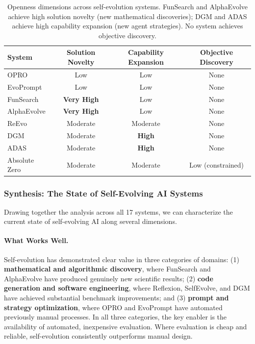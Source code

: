 \begin{table}[htbp]
\centering
\begin{tabular}{lccc}
\toprule
\textbf{System} & \textbf{Solution Novelty} & \textbf{Capability Expansion} & \textbf{Objective Discovery} \\
\midrule
OPRO & Low & Low & None \\
EvoPrompt & Low & Low & None \\
FunSearch & \textbf{Very High} & Low & None \\
AlphaEvolve & \textbf{Very High} & Low & None \\
ReEvo & Moderate & Moderate & None \\
DGM & Moderate & \textbf{High} & None \\
ADAS & Moderate & \textbf{High} & None \\
Absolute Zero & Moderate & Moderate & Low (constrained) \\
\bottomrule
\end{tabular}
\caption{Openness dimensions across self-evolution systems. FunSearch and AlphaEvolve achieve high solution novelty (new mathematical discoveries); DGM and ADAS achieve high capability expansion (new agent strategies). No system achieves objective discovery.}
\label{tab:openness}
\end{table}


\subsubsection{Synthesis: The State of Self-Evolving AI Systems}

Drawing together the analysis across all 17 systems, we can characterize the current state of self-evolving AI along several dimensions.

\paragraph{What Works Well.}
Self-evolution has demonstrated clear value in three categories of domains: (1) \textbf{mathematical and algorithmic discovery}, where FunSearch and AlphaEvolve have produced genuinely new scientific results; (2) \textbf{code generation and software engineering}, where Reflexion, SelfEvolve, and DGM have achieved substantial benchmark improvements; and (3) \textbf{prompt and strategy optimization}, where OPRO and EvoPrompt have automated previously manual processes. In all three categories, the key enabler is the availability of automated, inexpensive evaluation. Where evaluation is cheap and reliable, self-evolution consistently outperforms manual design.

